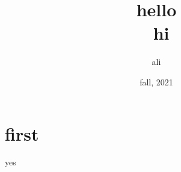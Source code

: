 \documentclass{article}
\title{hello\\
	\vspace{5mm}\
	\large hi}
\author{ali}
\date{fall, 2021}
\begin{document}
  
 \maketitle 
 \section{first}
 yes 
\end{document}

